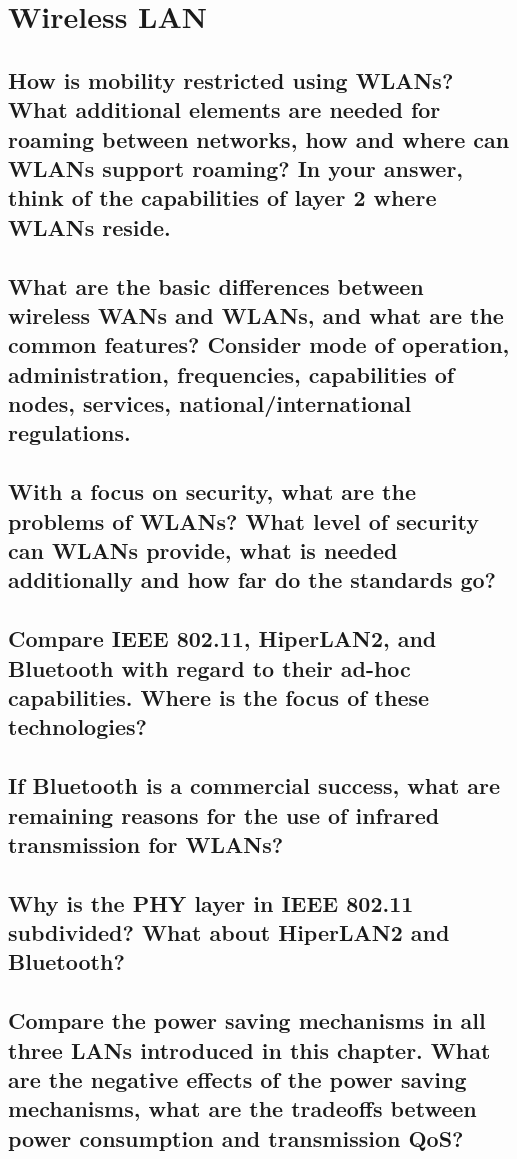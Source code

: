 \section{Wireless LAN}

\subsection{How is mobility restricted using WLANs? What additional elements are needed for
roaming between networks, how and where can WLANs support roaming? In your
answer, think of the capabilities of layer 2 where WLANs reside.}

\subsection{What are the basic differences between wireless WANs and WLANs, and what are
the common features? Consider mode of operation, administration, frequencies,
capabilities of nodes, services, national/international regulations.}

\subsection{With a focus on security, what are the problems of WLANs? What level of security
can WLANs provide, what is needed additionally and how far do the standards go?}

\subsection{Compare IEEE 802.11, HiperLAN2, and Bluetooth with regard to their ad-hoc
capabilities. Where is the focus of these technologies?}

\subsection{If Bluetooth is a commercial success, what are remaining reasons for the use of
infrared transmission for WLANs?}

\subsection{Why is the PHY layer in IEEE 802.11 subdivided? What about HiperLAN2 and
Bluetooth?}

\subsection{Compare the power saving mechanisms in all three LANs introduced in this chapter.
What are the negative effects of the power saving mechanisms, what are the tradeoffs
between power consumption and transmission QoS?}

